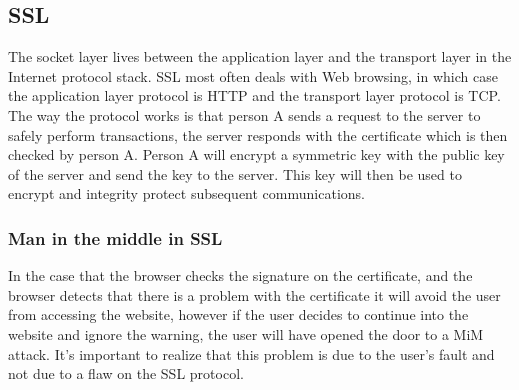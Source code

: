 \documentclass[a4paper]{article}
\begin{document}
\subsection{SSL}
The socket layer lives between the application layer and the transport layer in the Internet protocol stack. SSL most often deals with Web browsing, in which case the application layer protocol is HTTP and the transport layer protocol is TCP.\\
The way the protocol works is that person A sends a request to the server to safely perform transactions, the server responds with the certificate which is then checked by person A. Person A will encrypt a symmetric key with the public key of the server and send the key to the server. This key will then be used to encrypt and integrity protect subsequent communications.

\subsubsection{Man in the middle in SSL}
In the case that the browser checks the signature on the certificate, and the browser detects that there is a problem with the certificate it will avoid the user from accessing the website, however if the user decides to continue into the website and ignore the warning, the user will have opened the door to a MiM attack. It's important to realize that this problem is due to the user's fault and not due to a flaw on the SSL protocol.
\end{document}

